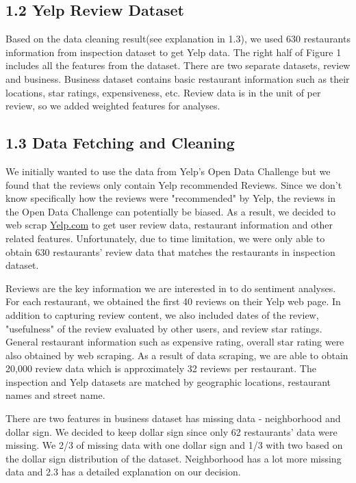 \documentclass[letterpaper, 11 pt, conference]{ieeeconf}
\begin{document}
\subsection*{1.2 Yelp Review Dataset}
Based on the data cleaning result(see explanation in 1.3), we used 630 restaurants information from inspection dataset to get Yelp data. The right half of Figure 1 includes all the features from the dataset. There are two separate datasets, review and business. Business dataset contains basic restaurant information such as their locations, star ratings, expensiveness, etc. Review data is in the unit of per review, so we added weighted features for analyses. 

\subsection*{1.3 Data Fetching and Cleaning}
We initially wanted to use the data from Yelp's Open Data Challenge but we found that the reviews only contain Yelp recommended Reviews. Since we don't know specifically how the reviews were "recommended" by Yelp, the reviews in the Open Data Challenge can potentially be biased. As a result, we decided to web scrap \url{Yelp.com} to get user review data, restaurant information and other related features. Unfortunately, due to time limitation, we were only able to obtain 630 restaurants' review data that matches the restaurants in inspection dataset. 

Reviews are the key information we are interested in to do sentiment analyses. For each restaurant, we obtained the first 40 reviews on their Yelp web page. In addition to capturing review content, we also included dates of the review, "usefulness" of the review evaluated by other users, and review star ratings. General restaurant information such as expensive rating, overall star rating were also obtained by web scraping. As a result of data scraping, we are able to obtain 20,000 review data which is approximately 32 reviews per restaurant. The inspection and Yelp datasets are matched by geographic locations, restaurant names and street name. 

There are two features in business dataset has missing data - neighborhood and dollar sign. We decided to keep dollar sign since only 62 restaurants' data were missing. We 2/3 of missing data with one dollar sign and 1/3 with two based on the dollar sign distribution of the dataset. Neighborhood has a lot more missing data and 2.3 has a detailed explanation on our decision.\newline
\end{document}
